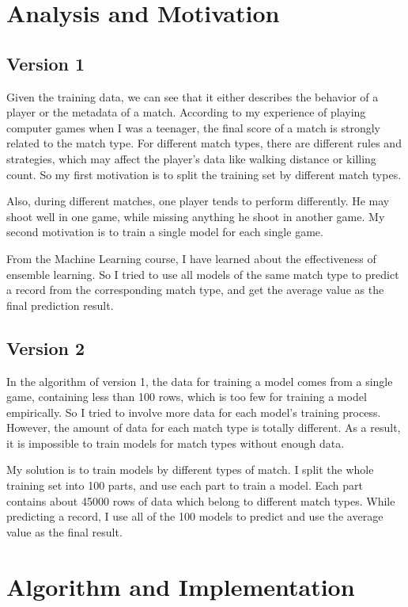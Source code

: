 \documentclass[journal=jacsat,manuscript=article]{achemso}
\begin{document}
\section{Analysis and Motivation}

\subsection{Version 1}

Given the training data, we can see that it either describes the behavior of a player
or the metadata of a match. According to my experience of playing computer games when I
was a teenager, the final score of a match is strongly related to the match type.
For different match types, there are different rules and strategies, which may affect the
player's data like walking distance or killing count. So my first motivation is to
split the training set by different match types.

Also, during different matches, one player tends to perform differently. He may shoot
well in one game, while missing anything he shoot in another game. My second motivation
is to train a single model for each single game.

From the Machine Learning course, I have learned about the effectiveness of ensemble learning.
So I tried to use all models of the same match type to predict a record from the corresponding
match type, and get the average value as the final prediction result.

\subsection{Version 2}

In the algorithm of version 1, the data for training a model comes from a single game,
containing less than 100 rows, which is too few for training a model empirically.
So I tried to involve more data for each model's training process. However, the amount of
data for each match type is totally different. As a result, it is impossible to train models
for match types without enough data.

My solution is to train models by different types of match. I split the whole training
set into 100 parts, and use each part to train a model. Each part contains about 45000 rows
of data which belong to different match types. While predicting a record, I 
use all of the 100 models to predict and use the average value as the final result.

\section{Algorithm and Implementation}
\end{document}
